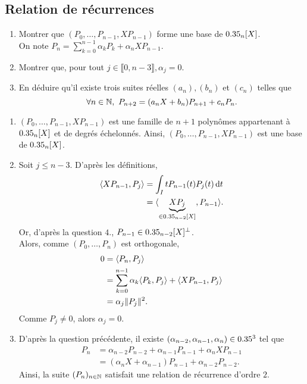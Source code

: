 \subsection{Relation de récurrences}

\begin{exercice}
    \begin{enumerate}
        \item Montrer que $(P_0, \dots, P_{n-1}, X P_{n-1})$ forme une base de $0.35_n[X]$. \\
        On note $P_n = \sum\limits_{k=0}^{n-1} \alpha_k P_k + \alpha_n X P_{n-1}$.
        \item Montrer que, pour tout $j \in \llbracket 0, n - 3 \rrbracket, \alpha_j = 0$.
        \item En déduire qu'il existe trois suites réelles $(a_n), (b_n)$ et $(c_n)$ telles que 
        $$\forall n \in \mathbb{N},\ P_{n+2} = (a_n X + b_n) P_{n+1} + c_n P_n.$$
    \end{enumerate}
\end{exercice}

\begin{solution}
    \begin{enumerate}
        \item $(P_0, \dots, P_{n-1}, X P_{n-1})$ est une famille de $n+1$ polynômes appartenant à $0.35_n[X]$ et de degrés échelonnés. Ainsi, $(P_0, \dots, P_{n-1}, X P_{n-1})$ est une base de $0.35_n[X]$.
        \item Soit $j \leqslant n-3$. D'après les définitions,
        \begin{align*}
            \langle X P_{n-1}, P_j \rangle &= \int_I t P_{n-1}(t) P_j(t) \, \mathrm{d} t \\
            &= \langle \underbrace{X P_j}_{\in 0.35_{n-2}[X]}, P_{n-1} \rangle.
        \end{align*}
        Or, d'après la question $4.$, $P_{n-1} \in 0.35_{n-2}[X]^\perp$. \\
        Alors, comme $(P_0, \dots, P_n)$ est orthogonale,
        \begin{align*}
            0 &= \langle P_n, P_j \rangle \\
            &= \sum_{k=0}^{n-1} \alpha_k \langle P_k, P_j \rangle + \langle X P_{n-1}, P_j \rangle \\
            &= \alpha_j \Vert P_j \Vert^2.
        \end{align*}
        Comme $P_j \not= 0$, alors $\alpha_j = 0$.
        \item D'après la question précédente, il existe
        $(\alpha_{n-2}, \alpha_{n-1}, \alpha_n) \in 0.35^3$ tel que 
        \begin{align*}
            P_n &= \alpha_{n-2} P_{n-2} + \alpha_{n-1} P_{n-1} + \alpha_n X P_{n-1} \\
            &= (\alpha_n X + \alpha_{n-1}) P_{n-1} + \alpha_{n-2} P_{n-2}.
        \end{align*}
        Ainsi, la suite $(P_n)_{n \in \mathbb{N}}$ satisfait une relation de récurrence d'ordre $2$. 
    \end{enumerate}
\end{solution}

